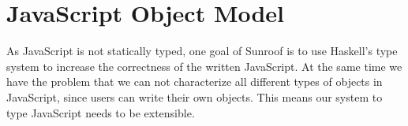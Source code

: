  
\section{JavaScript Object Model}
\label{sec:object-model}

\begin{comment}
JavaScript is object based. It provides various objects,
including numbers, booleans, maps, and others. We
provide in Sunroof about a dozen common object,
including \Src{JSObject} (the generic object type), \Src{JSNumber}
(floating point numbers), \Src{JSCanvas} (HTML5 canvas type) 
and others. A simple
casting function is provided when the type-system
needs to be overwritten. Along with each of these types,
we provide typed methods.
\begin{verbatim}
 jsDrawBox :: JSObject -> JS t ()
 jsDrawBox document = do
     foo <- document # getElementById("foo")
     cxt <- foo # getContext("2d")     cxt # drawRect (0,0,100,100)
\end{verbatim}
Here, \Src{\#} is a reverse apply, so the types
of the function in the above example are
\begin{verbatim}
(#) :: o -> (o -> JS t a) -> JS t a
getElementById :: JSString -> JSObject -> JS t JSContext
getContext :: JSString -> JSContext -> JS t JSCanvas
drawRect :: (JSNumber,JSNumber,JSNumber,JSNumber) -> JSCanvas -> JS t ()
\end{verbatim}        
From experience, even though we are targeting
an untyped language, the type system gets in the
way less than we expected.
\end{comment}

As JavaScript is not statically typed, one goal
of Sunroof is to use Haskell's type system to
increase the correctness of the written JavaScript.
At the same time we have the problem that we can not characterize 
all different types of objects in JavaScript, since 
users can write their own objects. This means our 
system to type JavaScript needs to be extensible.

